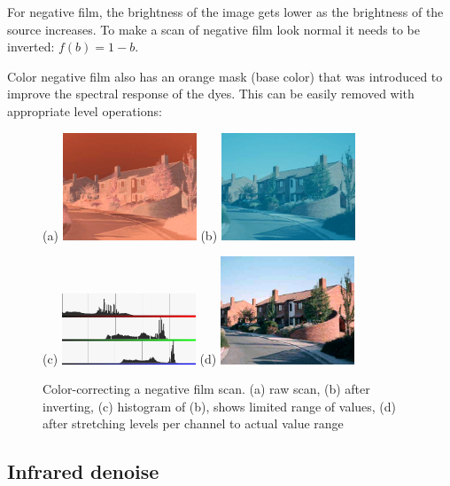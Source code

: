\documentclass{article}
\begin{document}
For negative film, the brightness of the image gets lower as the brightness of the
source increases. To make a scan of negative film look normal it needs to be inverted:
$f(b) = 1 - b$.

Color negative film also has an orange mask (base color) that was introduced to improve
the spectral response of the dyes. This can be easily removed with appropriate
level operations:

\begin{figure}[H]
  \centering
  (a) \includegraphics[width=4cm]{images/imgop_color1.jpg} \hspace{0.5cm}
  (b) \includegraphics[width=4cm]{images/imgop_color2.jpg}
  
  (c) \includegraphics[width=4cm]{images/imgop_color_h.jpg} \hspace{0.5cm}
  (d) \includegraphics[width=4cm]{images/imgop_color3.jpg}
  \caption{Color-correcting a negative film scan. (a) raw scan, (b) after inverting, 
           (c) histogram of (b), shows limited range of values, (d) after stretching levels per channel
           to actual value range}
\end{figure}

\subsection{Infrared denoise}
\end{document}
